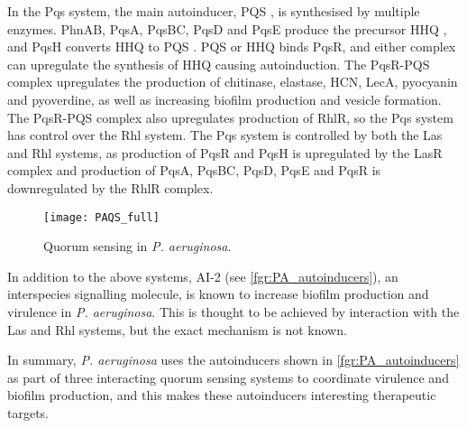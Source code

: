 In the Pqs system, the main autoinducer, PQS \cite{Pesci1999}, is synthesised by multiple enzymes. 
PhnAB\cite{Farrow2007}, PqsA, PqsBC, PqsD\cite{Lepine2003,Lepine2004} and PqsE\cite{Drees2015,Lin2018} produce the precursor HHQ , and PqsH converts HHQ  to PQS . 
PQS \cite{Wade2005} or HHQ  binds PqsR\cite{Xiao2006}, and either complex can upregulate the synthesis of HHQ  causing autoinduction. 
The PqsR-PQS complex upregulates the production of 
chitinase\cite{Deziel2005}, elastase\cite{Pesci1999}, HCN\cite{Deziel2005}, LecA\cite{Diggle2003}, pyocyanin\cite{Gallagher2002,Diggle2007} and pyoverdine\cite{Diggle2007}, as well as increasing biofilm production\cite{Diggle2003} and vesicle formation\cite{Mashburn2009}.
The PqsR-PQS complex also upregulates production of RhlR, so the Pqs system has control over the Rhl system\cite{McKnight2000}.
The Pqs system is controlled by both the Las and Rhl systems,
as production of PqsR\cite{Wade2005} and PqsH\cite{Gallagher2002} is upregulated by the LasR complex and 
production of PqsA, PqsBC, PqsD, PqsE\cite{McGrath2004} and PqsR\cite{Wade2005} is downregulated by the RhlR complex.


\begin{figure}[H]
	\begin{center}
		\texttt{[image: PAQS\_full]}
		\caption{Quorum sensing in \textit{P. aeruginosa}\cite{Dubern2008,Hodgkinson2011,Jimenez2012}. \label{fgr:PA_QS}}
	\end{center}
\end{figure}


In addition to the above systems, AI-2 (see \ref{fgr:PA_autoinducers}), an interspecies signalling molecule\cite{Pereira2013}, is known to increase biofilm production and virulence in \textit{P. aeruginosa}\cite{Li2015a,Li2017}. This is thought to be achieved by interaction with the Las and Rhl systems, but the exact mechanism is not known.

In summary, \textit{P. aeruginosa} uses the autoinducers shown in \ref{fgr:PA_autoinducers} as part of three interacting quorum sensing systems to coordinate virulence and biofilm production, and this makes these autoinducers interesting therapeutic targets. 


